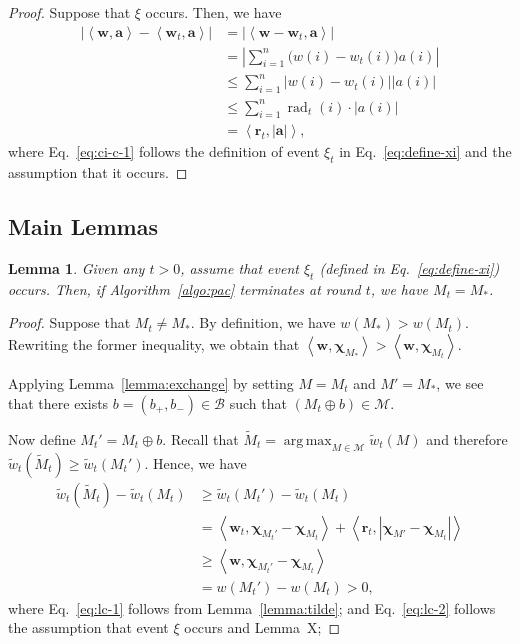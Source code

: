 \documentclass{article}
\newtheorem{lemma}{Lemma}
\newcommand{\M}{\mathcal M}
\newcommand{\B}{\mathcal B}
\DeclareMathOperator{\rad}{rad}
\DeclareMathOperator*{\argmax}{arg\,max}
\newcommand{\inn}[1]{\left\langle #1 \right\rangle}
\renewcommand{\vec}[1]{\boldsymbol{#1}}
\begin{document}
\begin{spacing}{1.1}
\begin{proof}
Suppose that $\xi$ occurs. Then, we have
\begin{align}
\big|\inn{\vec w,\vec a} - \inn{\vec w_t, \vec a}\big| 
&=\big|\inn{\vec w-\vec w_t,\vec a}\big| \nonumber \\
&=\left|\sum_{i=1}^n \big(w(i)-w_t(i)\big) a(i)  \right| \nonumber \\
&\le\sum_{i=1}^n \big| w(i)-w_t(i)\big| |a(i)| \nonumber \\
&\le\sum_{i=1}^{n} \rad_t(i) \cdot |a(i)| \label{eq:ci-c-1}\\
&= \inn{\vec r_t,  |\vec a|}, \nonumber
\end{align}
where Eq.~\eqref{eq:ci-c-1} follows the definition of event $\xi_t$ in Eq.~\eqref{eq:define-xi} and the assumption that it occurs.
\end{proof}


\subsection{Main Lemmas}

\begin{lemma}
\label{lemma:correct}
Given any $t > 0$, assume that event $\xi_t$ (defined in Eq.~\eqref{eq:define-xi}) occurs.
Then, if Algorithm~\ref{algo:pac} terminates at round $t$, we have $M_t=M_*$.
\end{lemma}

\begin{proof}
Suppose that $M_t \not= M_*$. 
By definition, we have $w(M_*)>w(M_t)$. 
Rewriting the former inequality, we obtain that $\inn{\vec w, \vec\chi_{M_*}} > \inn{\vec w,\vec\chi_{M_t}}$.

Applying Lemma~\ref{lemma:exchange} by setting $M=M_t$ and $M'=M_*$, we see that 
there exists $b=(b_+,b_-)\in \B$ such that $(M_t \oplus b) \in \M$.


Now define $M_t' = M_t \oplus b$.
Recall that $\tilde M_t =\argmax_{M\in \M} \tilde w_t(M)$ and therefore $\tilde w_t(\tilde M_t) \ge \tilde w_t(M_t')$.
Hence, we have
\begin{align}
  \tilde w_t(\tilde M_t)-\tilde w_t(M_t) 
  &\ge \tilde w_t(M_t')-\tilde w_t(M_t) \nonumber \\
  &= \inn{\vec w_t, \vec \chi_{M_t'}-\vec\chi_{M_t}}+\inn{\vec r_t, |\vec \chi_{M'}-\vec\chi_{M_t}|} \label{eq:lc-1}\\
  &\ge \inn{\vec w, \vec \chi_{M_t'}-\vec\chi_{M_t}} \label{eq:lc-2}\\
  &= w(M_t')-w(M_t) > 0 \label{eq:lc-3},
\end{align}
where Eq.~\eqref{eq:lc-1} follows from Lemma~\ref{lemma:tilde};
and Eq.~\eqref{eq:lc-2} follows the assumption that event $\xi$ occurs and Lemma~X;


\end{proof}
\end{spacing}
\end{document}
